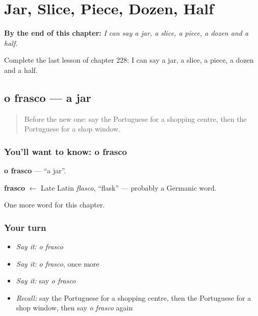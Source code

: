 
\chapter{Jar, Slice, Piece, Dozen, Half}
\label{ch:pt-jar-slice-piece-dozen-half}

\begin{chapteropening}
\textbf{By the end of this chapter:} \emph{I can say a jar, a slice, a piece, a dozen and a half.}

Complete the last lesson of chapter 228: I can say a jar, a slice, a piece, a dozen and a half.
\end{chapteropening}

\section[o frasco]{o frasco — a jar}

\label{lesson:PT-C228-frasco}



\begin{quote}
Before the new one: say the Portuguese for a shopping centre, then the Portuguese for a shop window.
\end{quote}

\subsection*{You'll want to know: o frasco}
\textbf{o frasco} — \textquotedblleft{}a jar\textquotedblright{}.

\begin{cousinweb}
\textbf{frasco} $\leftarrow$ Late Latin \emph{flasco}, \textquotedblleft{}flask\textquotedblright{} — probably a Germanic word.
\end{cousinweb}

\begin{grammarlens}[title={What you've built}]
One more word for this chapter.
\end{grammarlens}

\subsection*{Your turn}
\begin{itemize}
\raggedright
  \item \emph{Say it:} \emph{o frasco}
  \item \emph{Say it:} \emph{o frasco}, once more
  \item \emph{Say it:} say \emph{o frasco}
  \item \emph{Recall:} say the Portuguese for a shopping centre, then the Portuguese for a shop window, then say \emph{o frasco} again
\end{itemize}

